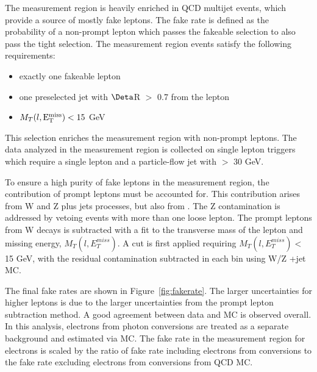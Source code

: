 The measurement region is heavily enriched in QCD multijet events, which provide a
source of mostly fake leptons. The fake rate is defined as the probability of a non-prompt lepton which passes the fakeable selection to also pass the tight selection.
The measurement region events satisfy the following requirements:

\begin{itemize}
 \item exactly one fakeable lepton
 \item one preselected jet with $\Deta$R $>$ 0.7 from the lepton
 \item $M_{T}(l,\mathrm{E}^{\mathrm{miss}}_{\mathrm{T}}) < 15$ GeV
\end{itemize}

\noindent This selection enriches the measurement region with non-prompt leptons. The data analyzed in the measurement region is collected on single lepton
triggers which require a single lepton and a particle-flow jet with \pt $>$ 30 GeV.

To ensure a high purity of fake leptons in the measurement region, the contribution of prompt leptons must be accounted for. This contribution arises from W and Z plus jets processes, but also from \ttbar. The Z contamination
is addressed by vetoing events with more than one loose lepton. The prompt leptons from W decays is subtracted with a fit to the transverse mass of the lepton and missing energy, $M_{T}(l,E_{T}^{miss})$. A cut is first applied requiring
$M_{T}(l,E_{T}^{miss}) < $15 GeV, with the residual contamination subtracted in each \pt bin using W/Z +jet MC. 

The final fake rates are shown in Figure~\ref{fig:fakerate}. The larger uncertainties for higher \pt leptons is due to the larger uncertainties from the prompt lepton subtraction method. A good agreement between data and MC is observed overall.
In this analysis, electrons from photon conversions are treated as a separate background and estimated via MC. The fake rate in the measurement region for electrons is scaled by the ratio of fake rate including electrons from conversions to
the fake rate excluding electrons from conversions from QCD MC. 


